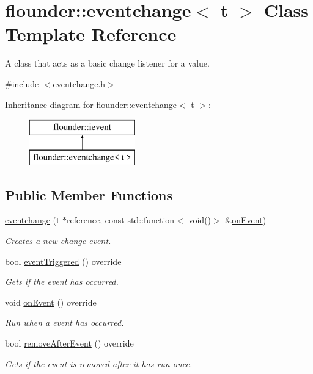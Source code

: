 \hypertarget{classflounder_1_1eventchange}{}\section{flounder\+:\+:eventchange$<$ t $>$ Class Template Reference}
\label{classflounder_1_1eventchange}


A class that acts as a basic change listener for a value.  




{\ttfamily \#include $<$eventchange.\+h$>$}

Inheritance diagram for flounder\+:\+:eventchange$<$ t $>$\+:\begin{figure}[H]
\begin{center}
\leavevmode
\includegraphics[height=2.000000cm]{classflounder_1_1eventchange}
\end{center}
\end{figure}
\subsection*{Public Member Functions}
\begin{DoxyCompactItemize}
\item 
\hyperlink{classflounder_1_1eventchange_aa10438da0bf89531d04211ede12f2ce1}{eventchange} (t $\ast$reference, const std\+::function$<$ void()$>$ \&\hyperlink{classflounder_1_1eventchange_aa4fd4c3c28ac6927c3a810c8775f232d}{on\+Event})
\begin{DoxyCompactList}\small\item\em Creates a new change event. \end{DoxyCompactList}\item 
bool \hyperlink{classflounder_1_1eventchange_a2ae3c1f7ae4342dfff2aae6f11b0b413}{event\+Triggered} () override
\begin{DoxyCompactList}\small\item\em Gets if the event has occurred. \end{DoxyCompactList}\item 
void \hyperlink{classflounder_1_1eventchange_aa4fd4c3c28ac6927c3a810c8775f232d}{on\+Event} () override
\begin{DoxyCompactList}\small\item\em Run when a event has occurred. \end{DoxyCompactList}\item 
bool \hyperlink{classflounder_1_1eventchange_ab3d476ecb51140e93886dc320ee44c33}{remove\+After\+Event} () override
\begin{DoxyCompactList}\small\item\em Gets if the event is removed after it has run once. \end{DoxyCompactList}\end{DoxyCompactItemize}
